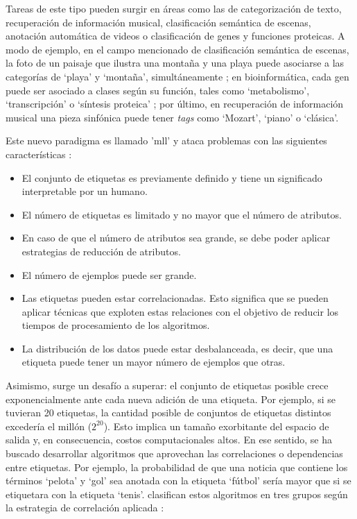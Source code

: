 Tareas de este tipo pueden surgir en áreas como las de categorización de texto,
recuperación de información musical, clasificación semántica de escenas,
anotación automática de videos o  clasificación de genes y funciones proteicas.
A modo de ejemplo, en el campo mencionado de clasificación semántica de escenas,
la foto de un paisaje que ilustra una montaña y una playa puede asociarse a las
categorías de ‘playa’ y ‘montaña’, simultáneamente \cite{gibaja_tutorial_2015};
en bioinformática, cada gen puede ser asociado a clases según su función, tales
como ‘metabolismo’, ‘transcripción’ o ‘síntesis proteica’
\cite{zhang_multi-label_2010}; por último, en recuperación de información
musical una pieza sinfónica puede tener \textit{tags} como ‘Mozart’, ‘piano’ o
‘clásica’.

Este nuevo paradigma es llamado '\acrlong{mll}'   y ataca problemas con las
siguientes características \cite{gibaja_tutorial_2015}:

\begin{itemize}

	\item El conjunto de etiquetas es previamente definido y tiene un significado
	      interpretable por un humano.

	\item El número de etiquetas es limitado y no mayor que el número de
	      atributos.

	\item En caso de que el número de atributos sea grande, se debe poder aplicar
	      estrategias de reducción de atributos.

	\item El número de ejemplos puede ser grande.

	\item Las etiquetas pueden estar correlacionadas. Esto significa que se
	      pueden aplicar técnicas que exploten estas relaciones con el objetivo de
	      reducir los tiempos de procesamiento de los algoritmos.

	\item La distribución de los datos puede estar desbalanceada, es decir, que
	      una etiqueta puede tener un mayor número de ejemplos que otras.

\end{itemize}

Asimismo, surge un desafío a superar: el conjunto de etiquetas posible crece
exponencialmente ante cada nueva adición de una etiqueta. Por ejemplo, si se
tuvieran 20 etiquetas, la cantidad posible de conjuntos de etiquetas distintos
excedería el millón (\(2^{20}\)). Esto implica un tamaño exorbitante del espacio
de salida y, en consecuencia, costos computacionales altos. En ese sentido, se
ha buscado desarrollar algoritmos que aprovechan las correlaciones o
dependencias entre etiquetas. Por ejemplo, la probabilidad de que una noticia
que contiene los términos ‘pelota’ y ‘gol’ sea anotada con la etiqueta ‘fútbol’
sería mayor que si se etiquetara con la etiqueta ‘tenis’.
\citeauthor{zhang_multi-label_2010} clasifican estos algoritmos en tres grupos
según la estrategia de correlación aplicada \cite{zhang_multi-label_2010}:

